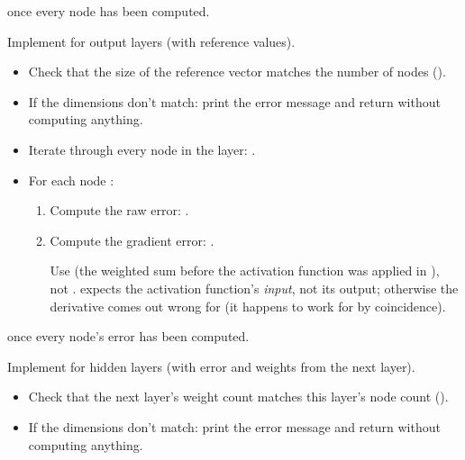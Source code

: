  once every node has been computed.

\label{c5:ex:12}
Implement  for output layers (with reference values).

\begin{itemize}
  \item Check that the size of the reference vector matches the number of nodes
    ().
  \item If the dimensions don't match: print the error message
     and return  without
    computing anything.
\end{itemize}

\begin{itemize}
  \item Iterate through every node in the layer:
    .
  \item For each node :
  \begin{enumerate}
    \item Compute the raw error: .
    \item Compute the gradient error:\newline
      .

      \note[Note!] Use  (the weighted sum before the activation
      function was applied in ), not .
       expects the activation function's \emph{input}, not its output;
      otherwise the derivative comes out wrong for  (it happens to work for
       by coincidence).
  \end{enumerate}
\end{itemize}

 once every node's error has been computed.

\label{c5:ex:13}
Implement  for hidden layers (with error and weights from the next layer).

\begin{itemize}
  \item Check that the next layer's weight count matches this layer's node count
    ().
  \item If the dimensions don't match: print the error message
     and return  without
    computing anything.
\end{itemize}

